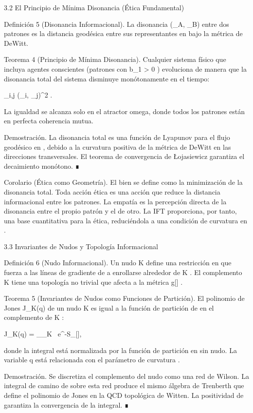 \documentclass[12pt,a4paper]{book}
\begin{document}
3.2 El Principio de Mínima Disonancia (Ética Fundamental)

Definición 5 (Disonancia Informacional). La disonancia  \Delta(\Pi_A, \Pi_B)  entre dos patrones es la distancia geodésica entre sus representantes en    bajo la métrica de DeWitt.

Teorema 4 (Principio de Mínima Disonancia). Cualquier sistema físico que incluya agentes conscientes (patrones con  b_1 > 0 ) evoluciona de manera que la disonancia total del sistema disminuye monótonamente en el tiempo:

 \sum_{i,j} \Delta(\Pi_i, \Pi_j)^2 .

La igualdad se alcanza solo en el atractor omega, donde todos los patrones están en perfecta coherencia mutua.

Demostración. La disonancia total es una función de Lyapunov para el flujo geodésico en   , debido a la curvatura positiva de la métrica de DeWitt en las direcciones transversales. El teorema de convergencia de Łojasiewicz garantiza el decaimiento monótono. ∎

Corolario (Ética como Geometría). El bien se define como la minimización de la disonancia total. Toda acción ética es una acción que reduce la distancia informacional entre los patrones. La empatía es la percepción directa de la disonancia entre el propio patrón y el de otro. La IFT proporciona, por tanto, una base cuantitativa para la ética, reduciéndola a una condición de curvatura en   .

3.3 Invariantes de Nudos y Topología Informacional

Definición 6 (Nudo Informacional). Un nudo  K \subset {}  define una restricción en  \rho  que fuerza a las líneas de gradiente de  \rho  a enrollarse alrededor de  K . El complemento   \setminus K  tiene una topología no trivial que afecta a la métrica  g[\rho] .

Teorema 5 (Invariantes de Nudos como Funciones de Partición). El polinomio de Jones  J_K(q)  de un nudo  K  es igual a la función de partición de  \rho  en el complemento de  K :

J_K(q) = \int_{_{\setminus K}} \rho \, e^{-S_{}[\rho]},

donde la integral está normalizada por la función de partición en    sin nudo. La variable  q  está relacionada con el parámetro de curvatura  \kappa .

Demostración. Se discretiza el complemento del nudo como una red de Wilson. La integral de camino de  \rho  sobre esta red produce el mismo álgebra de Trenberth que define el polinomio de Jones en la QCD topológica de Witten. La positividad de  \rho  garantiza la convergencia de la integral. ∎
\end{document}
